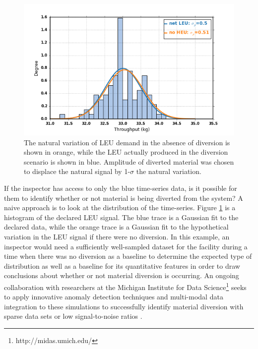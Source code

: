 \begin{figure}
\begin{center}
\includegraphics[natwidth=162bp,natheight=227bp, scale=0.7]{./figs/netLEU_hist_R5_new.png}
\end{center}
\caption{The natural variation of \gls{LEU} demand in the absence of diversion is shown in orange, while the \gls{LEU} actually produced in the diversion scenario is shown in blue. Amplitude of diverted material was chosen to displace the natural signal by 1-$\sigma$ the natural variation.}
\label{fig:leu_histogram}
\end{figure}

If the inspector has access to only the blue time-series data, is it possible for them to identify whether or not material is being diverted from the system?  A naive approach is to look at the distribution of the time-series.  Figure \ref{fig:leu_histogram} is a histogram of the declared \gls{LEU} signal.  The blue trace is a Gaussian fit to the declared data, while the orange trace is a Gaussian fit to the hypothetical variation in the \gls{LEU} signal if there were no diversion.  In this example, an inspector would need a sufficiently well-sampled dataset for the facility during a time when there was no diversion as a baseline to determine the expected type of distribution as well as a baseline for its quantitative features in order to draw conclusions about whether or not material diversion is occurring. An ongoing collaboration with researchers at the Michigan Institute for Data Science\footnote{http://midas.umich.edu/} seeks to apply innovative anomaly detection techniques and multi-modal data integration to these simulations to successfully identify material diversion with sparse data sets or low signal-to-noise ratios \cite{HERO_research}.






  